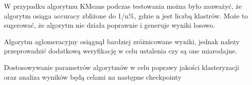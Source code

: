 \documentclass{classrep}
\begin{document}
{{            W przypadku algorytmu KMeans podczas testowania można było zauważyć, że algorytm osiąga accuracy zbliżone
            do 1/n\%, gdzie n jest liczbą klastrów. Może to sugerować, że algorytm nie działa poprawnie i generuje
            wyniki losowo.

            Algorytm aglomeracyjny osiągnął bardziej zróżnicowane wyniki, jednak należy przeprowadzić dodatkową
            weryfikację w celu ustalenia czy są one miarodajne.

            Dostosowywanie parametrów algorytmów w celu poprawy jakości klasteryzacji oraz analiza wyników będą
            celami na następne checkpointy
        }
    }


    \begin{thebibliography}{0}
    \end{thebibliography}
\end{document}
